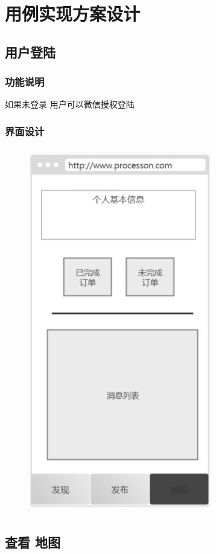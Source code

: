 \chapter{用例实现方案设计}

\section{用户登陆}

\subsection{功能说明}
如果未登录 用户可以微信授权登陆
\subsection{界面设计}

\begin{figure}[h]
    \centering
    \includegraphics[height=16.0cm,width=8.0cm]{design/image/ui8.png} 
    \end{figure}
\newpage    
\section{查看 地图}

